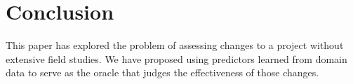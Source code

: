 \documentclass[conference]{IEEEtran}
\begin{document}
 




%


\section{Conclusion}
 
This paper has explored the problem of assessing changes to a project without
extensive field studies. We have proposed using predictors learned from domain data
to serve as the oracle that judges the effectiveness of those changes.
\end{document}
